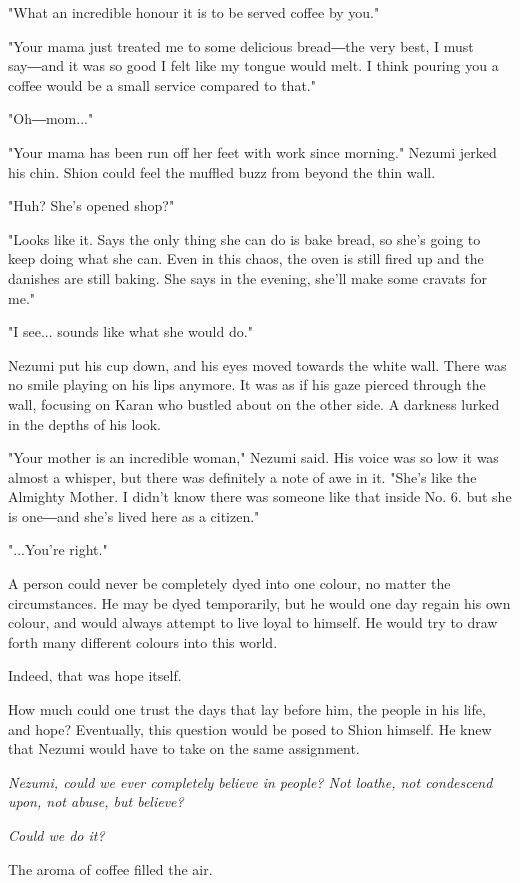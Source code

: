 "What an incredible honour it is to be served coffee by you."

"Your mama just treated me to some delicious bread―the very best, I must
say―and it was so good I felt like my tongue would melt. I think pouring
you a coffee would be a small service compared to that."

"Oh―mom..."

"Your mama has been run off her feet with work since morning." Nezumi
jerked his chin. Shion could feel the muffled buzz from beyond the thin
wall.

"Huh? She's opened shop?"

"Looks like it. Says the only thing she can do is bake bread, so she's
going to keep doing what she can. Even in this chaos, the oven is still
fired up and the danishes are still baking. She says in the evening,
she'll make some cravats for me."

"I see... sounds like what she would do."

Nezumi put his cup down, and his eyes moved towards the white wall.
There was no smile playing on his lips anymore. It was as if his gaze
pierced through the wall, focusing on Karan who bustled about on the
other side. A darkness lurked in the depths of his look.

"Your mother is an incredible woman," Nezumi said. His voice was so low
it was almost a whisper, but there was definitely a note of awe in it.
"She's like the Almighty Mother. I didn't know there was someone like
that inside No. 6. but she is one―and she's lived here as a citizen."

"...You're right."

A person could never be completely dyed into one colour, no matter the
circumstances. He may be dyed temporarily, but he would one day regain
his own colour, and would always attempt to live loyal to himself. He
would try to draw forth many different colours into this world.

Indeed, that was hope itself.

How much could one trust the days that lay before him, the people in his
life, and hope? Eventually, this question would be posed to Shion
himself. He knew that Nezumi would have to take on the same assignment.

\emph{Nezumi, could we ever completely believe in people? Not loathe, not
condescend upon, not abuse, but believe?}

\emph{Could we do it?}

The aroma of coffee filled the air.

